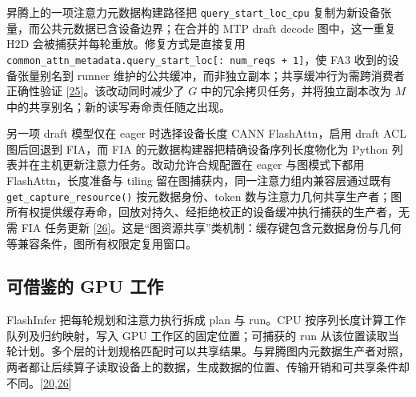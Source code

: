 \documentclass[
  UTF8,
  zihao=5]{ctexart}
\begin{document}
昇腾上的一项注意力元数据构建路径把 \texttt{query\_start\_loc\_cpu}
复制为新设备张量，而公共元数据已含设备边界；在合并的 MTP draft decode
图中，这一重复 H2D 会被捕获并每轮重放。修复方式是直接复用
\texttt{common\_attn\_metadata.query\_start\_loc{[}:\ num\_reqs\ +\ 1{]}}，使
FA3 收到的设备张量别名到 runner
维护的公共缓冲，而非独立副本；共享缓冲行为需跨消费者正确性验证
{[}\protect\hyperlink{ref-vllmascendpr21191}{25}{]}。该改动同时减少了
\(G\) 中的冗余拷贝任务，并将独立副本改为 \(M\)
中的共享别名；新的读写寿命责任随之出现。

另一项 draft 模型仅在 eager 时选择设备长度 CANN FlashAttn，启用 draft
ACL 图后回退到 FIA，而 FIA 的元数据构建器把精确设备序列长度物化为 Python
列表并在主机更新注意力任务。改动允许合规配置在 eager 与图模式下都用
FlashAttn，长度准备与 tiling 留在图捕获内，同一注意力组内兼容层通过既有
\texttt{get\_capture\_resource()} 按元数据身份、token
数与注意力几何共享生产者；图所有权提供缓存寿命，回放对持久、经拒绝校正的设备缓冲执行捕获的生产者，无需
FIA 任务更新
{[}\protect\hyperlink{ref-vllmascendpr21281}{26}{]}。这是``图资源共享''类机制：缓存键包含元数据身份与几何等兼容条件，图所有权限定复用窗口。

\hypertarget{ux53efux501fux9274ux7684-gpu-ux5de5ux4f5c-2}{%
\subsection{可借鉴的 GPU
工作}\label{ux53efux501fux9274ux7684-gpu-ux5de5ux4f5c-2}}

FlashInfer 把每轮规划和注意力执行拆成 plan 与 run。CPU
按序列长度计算工作队列及归约映射，写入 GPU 工作区的固定位置；可捕获的
run
从该位置读取当轮计划。多个层的计划规格匹配时可以共享结果。与昇腾图内元数据生产者对照，两者都让后续算子读取设备上的数据，生成数据的位置、传输开销和可共享条件却不同。{[}\protect\hyperlink{ref-ye2025flashinfer}{20},\protect\hyperlink{ref-vllmascendpr21281}{26}{]}
\end{document}
